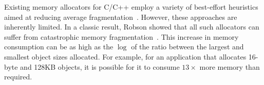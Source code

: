 Existing memory allocators for C/C++ employ a variety of
best-effort heuristics aimed at reducing average
fragmentation~\cite{johnstone:1998:fragmentation}. However, these
approaches are inherently limited. In a classic result, Robson showed
that all such allocators can suffer from catastrophic
memory fragmentation~\cite{robson:1977:worstcasefrag}. This increase
in memory consumption can be as high as the $\log$ of the ratio
between the largest and smallest object sizes allocated. For example,
for an application that allocates 16-byte and 128KB objects, it is
possible for it to consume $13\times$ more memory than required.

